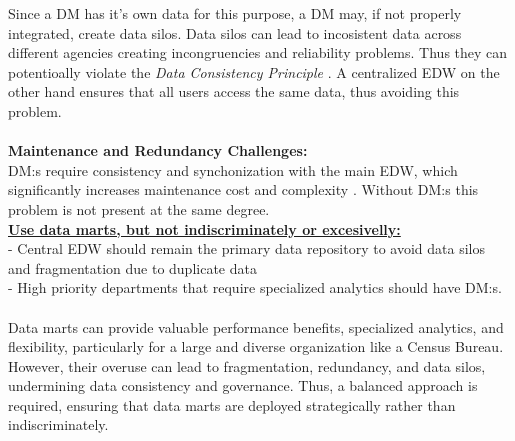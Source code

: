 Since a DM has it's own data for this purpose, a DM may, if not properly integrated, create data silos.
Data silos can lead to incosistent data across different agencies creating incongruencies and reliability problems.
Thus they can potentioally violate the \textit{Data Consistency Principle} \cite{l3video}.
A centralized EDW on the other hand ensures that all users access the same data, thus avoiding this problem.
\\\\\textbf{Maintenance and Redundancy Challenges:}\\
DM:s require consistency and synchonization with the main EDW, which significantly increases maintenance cost and complexity \cite[p.1230]{CourseLitt}.
Without DM:s this problem is not present at the same degree.\\


\textbf{\underline{Use data marts, but not indiscriminately or excesivelly:}}\\
- Central EDW should remain the primary data repository to avoid data silos and fragmentation due to duplicate data\\
- High priority departments that require specialized analytics should have DM:s.\\
\\Data marts can provide valuable performance benefits, specialized analytics, and flexibility, 
particularly for a large and diverse organization like a Census Bureau. 
However, their overuse can lead to fragmentation, redundancy, and data silos, 
undermining data consistency and governance. Thus, a balanced approach is required, 
ensuring that data marts are deployed strategically rather than indiscriminately.
